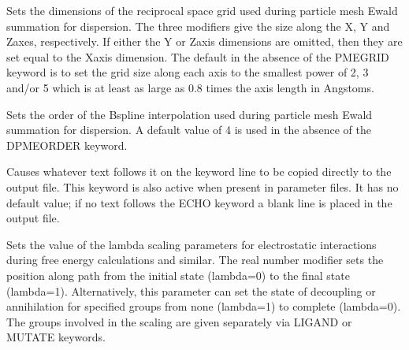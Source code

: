 \documentclass[letterpaper,11pt,english]{sphinxmanual}
\begin{document}
\ignorespaces {}\label{\detokenize{text/keywords:key-dpme-grid}}\begin{description}
\sphinxAtStartPar
Sets the dimensions of the reciprocal space grid used during particle mesh Ewald summation for dispersion. The three modifiers give the size along the X\sphinxhyphen{}, Y\sphinxhyphen{} and Z\sphinxhyphen{}axes, respectively. If either the Y\sphinxhyphen{} or Z\sphinxhyphen{}axis dimensions are omitted, then they are set equal to the X\sphinxhyphen{}axis dimension. The default in the absence of the PME\sphinxhyphen{}GRID keyword is to set the grid size along each axis to the smallest power of 2, 3 and/or 5 which is at least as large as 0.8 times the axis length in Angstoms.

\end{description}

\ignorespaces {}\label{\detokenize{text/keywords:key-dpme-order}}\begin{description}
\sphinxAtStartPar
Sets the order of the B\sphinxhyphen{}spline interpolation used during particle mesh Ewald summation for dispersion. A default value of 4 is used in the absence of the DPME\sphinxhyphen{}ORDER keyword.

\end{description}

\ignorespaces {}\label{\detokenize{text/keywords:key-echo}}\begin{description}
\sphinxAtStartPar
Causes whatever text follows it on the keyword line to be copied directly to the output file. This keyword is also active when present in parameter files. It has no default value; if no text follows the ECHO keyword a blank line is placed in the output file.

\end{description}

\ignorespaces {}\label{\detokenize{text/keywords:key-ele-lambda}}\begin{description}
\sphinxAtStartPar
Sets the value of the lambda scaling parameters for electrostatic interactions during free energy calculations and similar. The real number modifier sets the position along path from the initial state (lambda=0) to the final state (lambda=1). Alternatively, this parameter can set the state of decoupling or annihilation for specified groups from none (lambda=1) to complete (lambda=0). The groups involved in the scaling are given separately via LIGAND or MUTATE keywords.

\end{description}
\end{document}
